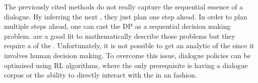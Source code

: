 The previously cited methods do not really capture the sequential essence of a dialogue. By inferring the next , they just plan one step ahead. In order to plan multiple steps ahead, one can cast the \gls{DP} as a sequential decision making problem.  are a good fit to mathematically describe those problems but they require a  of the . Unfortunately, it is not possible to get an analytic  of the  since it involves human decision making. To overcome this issue, dialogue policies can be optimised using \acrfull{RL} algorithms, where the only prerequisite is having a dialogue corpus or the ability to directly interact with the  in an  fashion.

